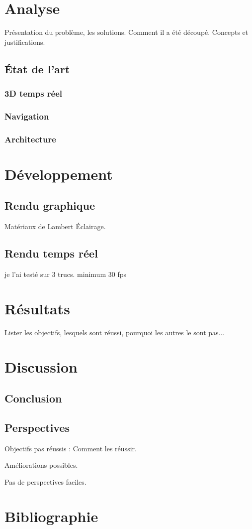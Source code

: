 \documentclass[a4paper,notitlepage]{report}
\begin{document}


\vspace*{\fill}

\vspace*{\fill}

\tableofcontents




\chapter{Analyse}
Présentation du problème, les solutions. Comment il a été découpé.
Concepts et justifications.
\section{État de l'art}
\subsection{3D temps réel}
\subsection{Navigation}
\subsection{Architecture}


\chapter{Développement}

\section{Rendu graphique}
Matériaux de Lambert
Éclairage.






\section{Rendu temps réel}
je l'ai testé sur 3 trucs. minimum 30 fps

\chapter{Résultats}
Lister les objectifs, lesquels sont réussi, pourquoi les autres le sont pas...

\chapter{Discussion}
\section{Conclusion}
\section{Perspectives}
Objectifs pas réussis : Comment les réussir.

Améliorations possibles.

Pas de perspectives faciles.


\chapter{Bibliographie}
\end{document}
